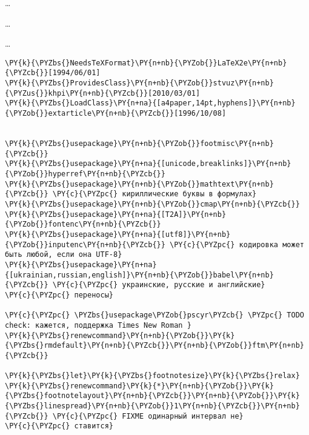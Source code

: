 \startAppendix

\label{add:addon1}

\ldots

\ldots

\ldots

\label{add:source}
\small
\begin{Verbatim}[commandchars=\\\{\}]
\PY{k}{\PYZbs{}NeedsTeXFormat}\PY{n+nb}{\PYZob{}}LaTeX2e\PY{n+nb}{\PYZcb{}}[1994/06/01]
\PY{k}{\PYZbs{}ProvidesClass}\PY{n+nb}{\PYZob{}}stvuz\PY{n+nb}{\PYZus{}}khpi\PY{n+nb}{\PYZcb{}}[2010/03/01]
\PY{k}{\PYZbs{}LoadClass}\PY{n+na}{[a4paper,14pt,hyphens]}\PY{n+nb}{\PYZob{}}extarticle\PY{n+nb}{\PYZcb{}}[1996/10/08]


\PY{k}{\PYZbs{}usepackage}\PY{n+nb}{\PYZob{}}footmisc\PY{n+nb}{\PYZcb{}}
\PY{k}{\PYZbs{}usepackage}\PY{n+na}{[unicode,breaklinks]}\PY{n+nb}{\PYZob{}}hyperref\PY{n+nb}{\PYZcb{}}
\PY{k}{\PYZbs{}usepackage}\PY{n+nb}{\PYZob{}}mathtext\PY{n+nb}{\PYZcb{}} \PY{c}{\PYZpc{} кириллические буквы в формулах}
\PY{k}{\PYZbs{}usepackage}\PY{n+nb}{\PYZob{}}cmap\PY{n+nb}{\PYZcb{}}
\PY{k}{\PYZbs{}usepackage}\PY{n+na}{[T2A]}\PY{n+nb}{\PYZob{}}fontenc\PY{n+nb}{\PYZcb{}}
\PY{k}{\PYZbs{}usepackage}\PY{n+na}{[utf8]}\PY{n+nb}{\PYZob{}}inputenc\PY{n+nb}{\PYZcb{}} \PY{c}{\PYZpc{} кодировка может быть любой, если она UTF-8}
\PY{k}{\PYZbs{}usepackage}\PY{n+na}{[ukrainian,russian,english]}\PY{n+nb}{\PYZob{}}babel\PY{n+nb}{\PYZcb{}} \PY{c}{\PYZpc{} украинские, русские и английские}
\PY{c}{\PYZpc{} переносы}

\PY{c}{\PYZpc{} \PYZbs{}usepackage\PYZob{}pscyr\PYZcb{} \PYZpc{} TODO check: кажется, поддержка Times New Roman }
\PY{k}{\PYZbs{}renewcommand}\PY{n+nb}{\PYZob{}}\PY{k}{\PYZbs{}rmdefault}\PY{n+nb}{\PYZcb{}}\PY{n+nb}{\PYZob{}}ftm\PY{n+nb}{\PYZcb{}}

\PY{k}{\PYZbs{}let}\PY{k}{\PYZbs{}footnotesize}\PY{k}{\PYZbs{}relax}
\PY{k}{\PYZbs{}renewcommand}\PY{k}{*}\PY{n+nb}{\PYZob{}}\PY{k}{\PYZbs{}footnotelayout}\PY{n+nb}{\PYZcb{}}\PY{n+nb}{\PYZob{}}\PY{k}{\PYZbs{}linespread}\PY{n+nb}{\PYZob{}}1\PY{n+nb}{\PYZcb{}}\PY{n+nb}{\PYZcb{}} \PY{c}{\PYZpc{} FIXME одинарный интервал не}
\PY{c}{\PYZpc{} ставится}


\end{Verbatim}
